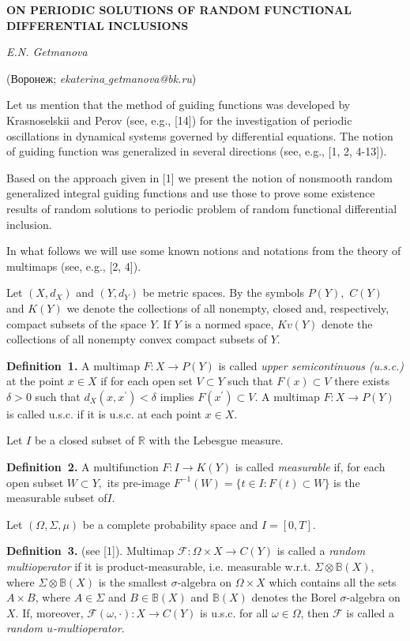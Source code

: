 \begin{center}
    {\bf ON PERIODIC SOLUTIONS OF RANDOM FUNCTIONAL DIFFERENTIAL INCLUSIONS}

    {\it E.N. Getmanova}

    (Воронеж; {\it ekaterina$\_$getmanova@bk.ru})
\end{center}



Let us mention that the method of guiding functions was developed by Krasnoselskii and Perov (see, e.g., [14]) for the investigation of periodic oscillations in dynamical systems go\-ver\-ned by differential equations. The notion of guiding function was generalized in several directions (see, e.g., [1, 2, 4-13]).

Based on the approach given in [1] we present the notion of nonsmooth random generalized integral guiding functions and use those to prove some existence results of random solutions to periodic problem of random functional differential inclusion.

In what follows we will use some known notions and notati\-ons from the theory of multimaps (see, e.g., [2, 4]).

Let $(X,d_X)$ and $(Y,d_Y)$ be metric spaces. By the symbols $P(Y),$ $C(Y)$ and $K(Y)$ we denote the collections of all nonemp\-ty, closed and, respectively, compact subsets of the space $Y.$ If $Y$ is a normed space, $Kv(Y)$ denote the collections of all nonempty convex compact subsets of $Y.$

\textbf{Definition~1.}
A multimap $F:X \to P(Y)$ is called {\it upper semicontinuous (u.s.c.)} at the point $x\in X$  if for each open set $V \subset Y$ such that $F(x) \subset V$ there exists $\delta >0$ such that $d_X(x,x^\prime)<\delta$ implies $F(x^\prime)\subset V.$  A multimap $F:X \to P(Y)$ is called u.s.c. if it is u.s.c. at each point $x\in X.$

Let $I$ be a closed subset of $\mathbb{R}$ with the Lebesgue measure.

\textbf{Definition~2.}
A multifunction $F:I \to K(Y)$ is called {\it measurable} if, for each open subset $W \subset Y,$ its pre-image \linebreak
$F^{-1}(W)=\{t\in I:F(t)\subset W\}$ is the measurable subset of$I.$

Let $(\Omega,\Sigma,\mu)$ be a complete probability space and $I=[0,T]$.

\textbf{Definition~3.} (see [1]). Multimap $\mathcal{F}\colon\Omega\times X\to C(Y)$ is called a {\it random multioperator} if it is product-measurable, i.e. measurable w.r.t. $\Sigma\otimes\mathbb{B}(X)$, where $\Sigma\otimes\mathbb{B}(X)$ is the smallest
$\sigma$-algebra on $\Omega\times X$ which contains all the sets $A\times B$, where $A\in\Sigma$ and $B\in\mathbb{B}(X)$ and
$\mathbb{B}(X)$ denotes the Borel $\sigma$-algebra on $X$. If, moreover, $\mathcal{F}(\omega,\cdot)\colon X\to C(Y)$ is u.s.c. for all
$\omega\in\Omega$, then $\mathcal{F}$ is called a {\it random $u$-multioperator}.

